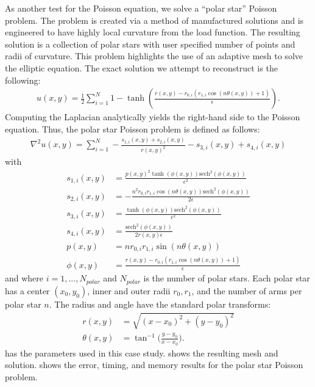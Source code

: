 As another test for the Poisson equation, we solve a ``polar star'' Poisson problem. The problem is created via a method of manufactured solutions and is engineered to have highly local curvature from the load function. The resulting solution is a collection of polar stars with user specified number of points and radii of curvature. This problem highlights the use of an adaptive mesh to solve the elliptic equation. The exact solution we attempt to reconstruct is the following:
\begin{align}
    u(x,y) = \frac{1}{2} \sum_{i=1}^{N} 1 - \tanh \left(\frac{r(x,y)-r_{0,i} \left(r_{1,i} \cos \left(n \theta(x,y)\right)+1\right)}{\epsilon }\right).
\end{align}
Computing the Laplacian analytically yields the right-hand side to the Poisson equation. Thus, the polar star Poisson problem is defined as follows:
\begin{align}
    \nabla^2 u(x,y) = \sum_{i=1}^N -\frac{s_{1,i}(x,y) + s_{2,i}(x, y)}{r(x,y)^2} - s_{3,i}(x,y) + s_{4,i}(x,y)
\end{align}
with
\begin{align*}
    s_{1,i}(x,y) &= \frac{p(x,y)^2 \tanh \left(\phi(x,y)\right) \text{sech}^2\left(\phi(x,y)\right)}{\epsilon ^2} \\
    s_{2,i}(x,y) &= -\frac{n^2 r_{0,i} r_{1,i} \cos (n \theta(x,y)) \text{sech}^2\left(\phi(x,y)\right)}{2 \epsilon } \\
    s_{3,i}(x,y) &= \frac{\tanh \left(\phi(x,y)\right) \text{sech}^2\left(\phi(x,y)\right)}{\epsilon ^2} \\
    s_{4,i}(x,y) &= \frac{\text{sech}^2\left(\phi(x,y)\right)}{2 r(x,y) \epsilon } \\
    p(x,y) &= n r_{0,i} r_{1,i} \sin (n \theta(x,y)) \\
    \phi(x,y) &= \frac{r(x,y)-r_{0,i} (r_{1,i} \cos (n \theta(x,y))+1)}{\epsilon}
\end{align*}
and where $i=1, ..., N_{polar}$ and $N_{polar}$ is the number of polar stars. Each polar star has a center $(x_0, y_0)$, inner and outer radii $r_0, r_1$, and the number of arms per polar star $n$. The radius and angle have the standard polar transforms:
\begin{align}
    r(x,y) &= \sqrt{(x - x_0)^2 + (y - y_0)^2} \\
    \theta(x,y) &= \tan^{-1}\Big(\frac{y - y_0}{x - x_0}\Big).
\end{align}
 has the parameters used in this case study.  shows the resulting mesh and solution.  shows the error, timing, and memory results for the polar star Poisson problem.
